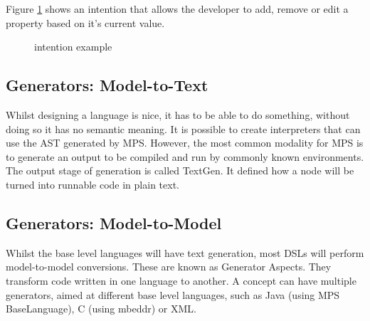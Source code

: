 Figure \ref{fig:intention_example} shows an intention that allows the developer to add, remove or edit a property based on it's current value.
\begin{figure}[h]
    \centering
    \caption{intention example}
    \label{fig:intention_example}
\end{figure}

\subsection{Generators: Model-to-Text}
Whilst designing a language is nice, it has to be able to do something, without doing so it has no semantic meaning.
It is possible to create interpreters that can use the AST generated by MPS.
However, the most common modality for MPS is to generate an output to be compiled and run by commonly known environments.
The output stage of generation is called TextGen.
It defined how a node will be turned into runnable code in plain text.

\subsection{Generators: Model-to-Model}
Whilst the base level languages will have text generation, most DSLs will perform model-to-model conversions.
These are known as Generator Aspects.
They transform code written in one language to another.
A concept can have multiple generators, aimed at different base level languages, such as Java (using MPS BaseLanguage), C (using mbeddr) or XML.